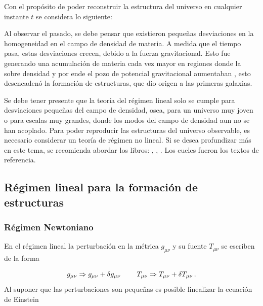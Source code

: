 Con el propósito de poder reconstruir la estructura del universo en cualquier instante $t$ se considera lo siguiente:

Al observar el pasado, se debe pensar que existieron pequeñas desviaciones en la homogeneidad en el campo de densidad de materia. A medida que el tiempo pasa, estas desviaciones crecen, debido a la fuerza gravitacional. Esto fue generando una acumulación de materia cada vez mayor en regiones donde la sobre densidad y por ende el pozo de potencial gravitacional aumentaban
, esto desencadenó la formación de estructuras, que dio origen a las primeras galaxias. 

Se debe tener presente que la teoría del régimen lineal solo se cumple para desviaciones pequeñas del campo de densidad, osea, para un universo muy joven o para escalas muy grandes, donde los modos del campo de densidad aun no se han acoplado. Para poder reproducir las estructuras del universo observable, es necesario considerar un teoría de régimen no lineal. Si se desea profundizar más en este tema, se recomienda abordar los libros: \cite{padmanabhan1995}, \cite{longair2008}, \cite{coles2002}. Los cueles fueron los textos de referencia.


\subsection{Régimen lineal para la formación de estructuras}
\label{subsec:Lineal_Estructure_Formation}


	\subsubsection{Régimen Newtoniano}
	\label{subsubsec:Newtonian_Regimen}


En el régimen lineal la perturbación en la métrica $g_{\mu\nu}$ y su fuente $T_{\mu\nu}$ se escriben de la forma

\begin{equation}
g_{\mu\nu} \Rightarrow g_{\mu\nu}+\delta g_{\mu\nu} \hspace{0.8cm} T_{\mu\nu} \Rightarrow T_{\mu\nu} +\delta T_{\mu\nu} \,.
\end{equation}
%
Al suponer que las perturbaciones son pequeñas es posible linealizar la ecuación de Einstein 

